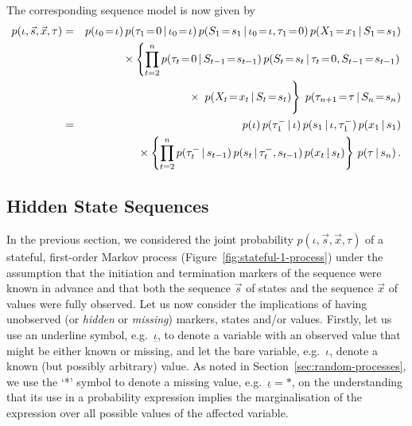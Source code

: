 \documentclass[a4paper]{article}
\begin{document}
The corresponding sequence model is now given by
\begin{eqnarray}
p({\iota},\vec{s},\vec{x},{\tau}) & = & 
p(\iota_0\!=\!{\iota})\,p(\tau_1\!=\!0\,|\,\iota_0\!=\!{\iota})
\,p(S_1\!=\!s_1\,|\,\iota_0\!=\!{\iota},\tau_1\!=\!0)
\,p(X_1\!=\!x_1\,|\,S_1\!=\!s_1)
\nonumber\\&&
{}\times\left\{\prod_{t=2}^{n}p(\tau_t\!=\!0\,|\,S_{t-1}\!=\!s_{t-1})
\,p(S_t\!=\!s_t\,|\,\tau_t\!=\!0,S_{t-1}\!=\!s_{t-1})\right.
\nonumber\\&&\hspace*{10mm}{}\times\left.\rule{0pt}{6mm}
\,p(X_t\!=\!x_t\,|\,S_t\!=\!s_t)\right\}
\;p(\tau_{n+1}\!=\!{\tau}\,|\,S_n\!=\!s_n)
\nonumber\\
&=&
p({\iota})\,p(\tau^-_1\,|\,{\iota})
\,p(s_1\,|\,{\iota},\tau^-_1)
\,p(x_1\,|\,s_1)
\nonumber\\&&
{}\times\left\{\prod_{t=2}^{n}p(\tau^-_t\,|\,s_{t-1})
\,p(s_t\,|\,\tau^-_t,s_{t-1})\,p(x_t\,|\,s_t)\right\}
\,p({\tau}\,|\,s_n)
\,.
\label{eq:stateful-1-model}
\end{eqnarray}

\subsection{Hidden State Sequences}\label{sec:hidden-state}

In the previous section, we considered the joint probability $p({\iota},\vec{s},\vec{x},{\tau})$ of a stateful, first-order Markov process (Figure~\ref{fig:stateful-1-process}) under the assumption that the initiation and termination markers of the sequence were known in advance and that
both the sequence $\vec{s}$ of states and the sequence $\vec{x}$ of values were fully observed.
Let us now consider the implications of having unobserved (or {\em hidden} or {\em missing}) markers, states and/or values.
Firstly, let us use an underline symbol, e.g.\ $\underline{\iota}$, to denote a variable with an observed value that might be either known or missing, and let the bare variable, e.g.\
$\iota$, denote a known (but possibly arbitrary) value. As noted in Section~\ref{sec:random-processes}, we use the `*' symbol to denote a missing value, e.g.\ $\underline{\iota}=*$,
on the understanding that its use in a probability expression implies the marginalisation of the expression over all possible values of the affected variable.
\end{document}
